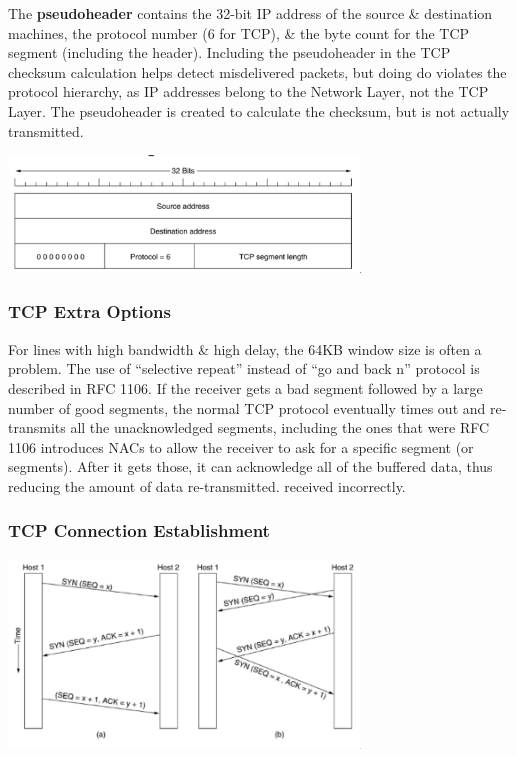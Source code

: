 \documentclass[11pt]{article}
\begin{document}
The \textbf{pseudoheader} contains the 32-bit IP address of the source \& destination machines, the protocol 
number (6 for TCP), \& the byte count for the TCP segment (including the header).
Including the pseudoheader in the TCP checksum calculation helps detect misdelivered packets, but doing 
do violates the protocol hierarchy, as IP addresses belong to the Network Layer, not the TCP Layer.
The pseudoheader is created to calculate the checksum, but is not actually transmitted.
\begin{center}
    \includegraphics[width=0.7\textwidth]{tcppseudoheader.png}
\end{center}

\subsubsection{TCP Extra Options}
For lines with high bandwidth \& high delay, the 64KB window size is often a problem. 
The use of ``selective repeat'' instead of ``go and back n'' protocol is described in RFC 1106. 
If the receiver gets a bad segment followed by a large number of good segments, the normal TCP protocol eventually times out and re-transmits all the unacknowledged segments, including the ones that were 
RFC 1106 introduces NACs to allow the receiver to ask for a specific segment (or segments). 
After it gets those, it can acknowledge all of the buffered data, thus reducing the amount of data re-transmitted.
received incorrectly.

\subsubsection{TCP Connection Establishment}
\begin{center}
    \includegraphics[width=0.7\textwidth]{tcpconnectionestablishment.png}
\end{center}
\end{document}
